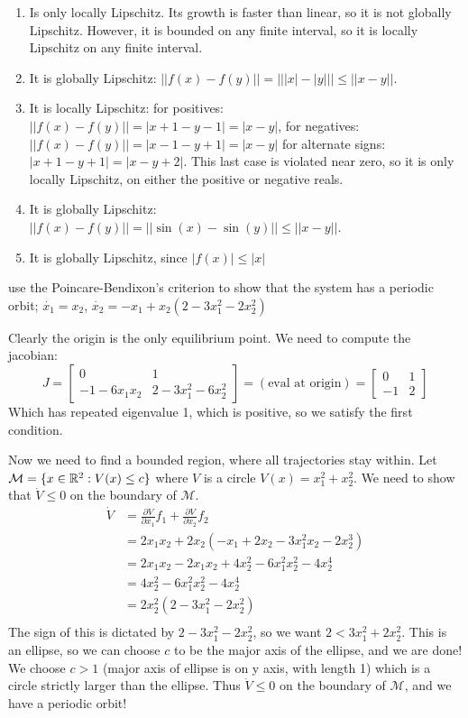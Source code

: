 \documentclass[11pt]{article}
\begin{document}
\soln

\begin{enumerate}
    \item Is only locally Lipschitz. Its growth is faster than linear, so it is not globally Lipschitz.
    However, it is bounded on any finite interval, so it is locally Lipschitz on any finite interval.
    \item It is globally Lipschitz: $||f(x) - f(y)|| = |||x| - |y||| \leq ||x - y||$.
    \item It is locally Lipschitz: for positives: $||f(x) - f(y)|| = |x + 1 - y - 1| = |x - y|$, for negatives: $||f(x) - f(y)|| = |x - 1 - y + 1| = |x - y|$
    for alternate signs: $|x + 1 - y + 1| = |x - y + 2|$. This last case is violated near zero, so it is only locally Lipschitz, on either the positive or negative reals.
    \item It is globally Lipschitz: $||f(x) - f(y)|| = ||\sin(x) - \sin(y)|| \leq ||x - y||$.
    \item It is globally Lipschitz, since $|f(x)| \leq |x|$
\end{enumerate}



use the Poincare-Bendixon's criterion to
show that the system has a periodic orbit;
$\dot{x_1} = x_2$, $\dot{x_2} = -x_1 + x_2(2 - 3x_1^2 - 2 x_2^2)$

\soln

Clearly the origin is the only equilibrium point.
We need to compute the jacobian:
$$
J = \begin{bmatrix}
    0 & 1 \\ -1 - 6x_1x_2 & 2 - 3x_1^2 - 6x_2^2
\end{bmatrix} = (\text{eval at origin}) = \begin{bmatrix}
    0 & 1 \\ -1 & 2
\end{bmatrix}
$$
Which has repeated eigenvalue 1, which is positive, so we satisfy the first condition.

Now we need to find a bounded region, where all trajectories stay within. 
Let $\mathcal{M} = \{x \in \mathbb{R}^2: V(x) \leq c\}$ where $V$ is a circle $V(x) = x_1^2 + x_2^2$.
We need to show that $\dot{V} \leq 0$ on the boundary of $\mathcal{M}$.
\begin{align*}
    \dot{V} &= \frac{\partial V}{\partial x_1}f_1 + \frac{\partial V}{\partial x_2} f_2 \\
    &= 2x_1x_2 + 2x_2(-x_1 + 2x_2 - 3x_1^2x_2 - 2x_2^3)\\
    &= 2x_1x_2 - 2x_1x_2 + 4x_2^2 - 6x_1^2x_2^2 - 4x_2^4\\
    &= 4x_2^2 - 6x_1^2x_2^2 - 4x_2^4\\
    &= 2x_2^2(2 - 3x_1^2 - 2x_2^2)\\
\end{align*}
The sign of this is dictated by $2 - 3x_1^2 - 2x_2^2$, so we want $2 < 3x_1^2 + 2x_2^2$.
This is an ellipse, so we can choose $c$ to be the major axis of the ellipse, and we are done!
We choose $c > 1$ (major axis of ellipse is on y axis, with length 1) which is a circle strictly larger than the ellipse.
Thus $\dot{V} \leq 0$ on the boundary of $\mathcal{M}$, and we have a periodic orbit!
\end{document}

